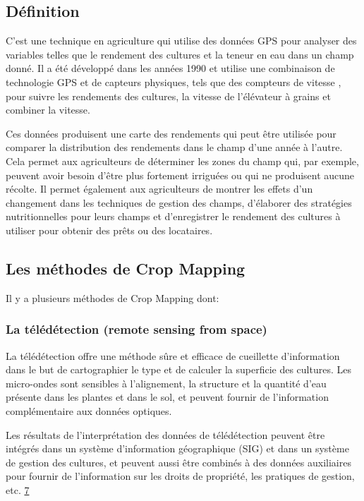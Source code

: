 \documentclass[12pt, openany]{report}
\begin{document}
\subsection{Définition}
C’est une technique en agriculture qui utilise des données GPS pour analyser des variables telles que le rendement des cultures et la teneur en eau dans un champ donné. Il a été développé dans les années 1990 et utilise une combinaison de technologie GPS et de capteurs physiques, tels que des compteurs de vitesse , pour suivre les rendements des cultures, la vitesse de l'élévateur à grains et combiner la vitesse.
\par
Ces données produisent une carte des rendements qui peut être utilisée pour comparer la distribution des rendements dans le champ d'une année à l'autre. Cela permet aux agriculteurs de déterminer les zones du champ qui, par exemple, peuvent avoir besoin d'être plus fortement irriguées ou qui ne produisent aucune récolte. Il permet également aux agriculteurs de montrer les effets d'un changement dans les techniques de gestion des champs, d'élaborer des stratégies nutritionnelles pour leurs champs et d'enregistrer le rendement des cultures à utiliser pour obtenir des prêts ou des locataires.

\subsection{Les méthodes de Crop Mapping}

Il y a plusieurs méthodes de Crop Mapping dont:

\subsubsection{La télédétection (remote sensing from space)}
La télédétection offre une méthode sûre et efficace de cueillette d'information dans le but de cartographier le type et de calculer la superficie des cultures.
Les micro-ondes sont sensibles à l'alignement, la structure et la quantité d'eau présente dans les plantes et dans le sol, et peuvent fournir de l'information complémentaire aux données optiques. 
\par
Les résultats de l'interprétation des données de télédétection peuvent être intégrés dans un système d'information géographique (SIG) et dans un système de gestion des cultures, et peuvent aussi être combinés à des données auxiliaires pour fournir de l'information sur les droits de propriété, les pratiques de gestion, etc. \hyperref[sec:refs]{7}
\end{document}
